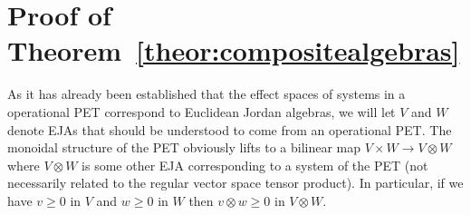 \documentclass[b5paper,onecolumn,12pt,accepted=2019-05-03, issue=1, volume=1, shorttitle=papers/compositionality-1-1]{compositionalityarticle}
\DeclarePairedDelimiter{\inn}{\langle}{\rangle}
\newcounter{counter}
\numberwithin{counter}{section}
\newtheorem{theorem}[counter]{Theorem}
\begin{document}



\section{Proof of Theorem~\ref{theor:compositealgebras}}\label{sec:compositesappendix}

As it has already been established that the effect spaces of systems in a operational PET correspond to Euclidean Jordan algebras, we will let $V$ and $W$ denote EJAs that should be understood to come from an operational PET. The monoidal structure of the PET obviously lifts to a bilinear map $V\times W\rightarrow V\otimes W$ where $V\otimes W$ is some other EJA corresponding to a system of the PET (not necessarily related to the regular vector space tensor product). In particular, if we have $v\geq 0$ in $V$ and $w\geq 0$ in $W$ then $v\otimes w\geq 0$ in $V\otimes W$.
\end{document}
